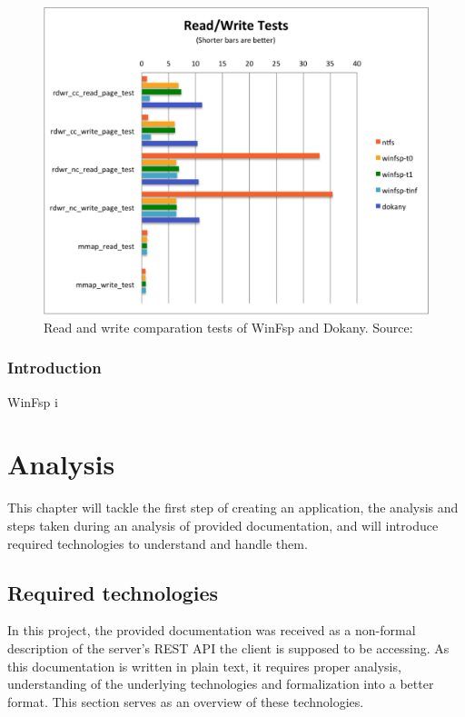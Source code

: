 \begin{figure}[htb]
	\centering
	\includegraphics[width=\columnwidth]{obrazky-figures/rdwr_tests.pdf}
	\caption{Read and write comparation tests of WinFsp and Dokany. Source:\cite{GitWinFsp}}
	\label{winfsp_rdwr_tests}
\end{figure}

\subsection*{Introduction}
WinFsp i

\chapter{Analysis}
\label{ch4}
This chapter will tackle the first step of creating an application, the analysis and steps taken during an analysis of provided documentation, and will introduce required technologies to understand and handle them.


\section{Required technologies}
In this project, the provided documentation was received as a non-formal description of the server's REST API the client is supposed to be accessing. As this documentation is written in plain text, it requires proper analysis, understanding of the underlying technologies and formalization into a better format. This section serves as an overview of these technologies.

